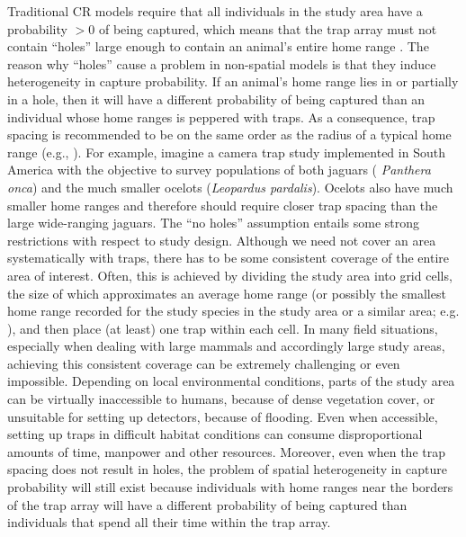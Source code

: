 Traditional CR models require that all individuals in the study area
have a probability $>0$ of being captured, which means that the trap
array must not contain ``holes'' large enough to contain an animal's
entire home range \citep{otis_etal:1978}. The reason why ``holes''
cause a problem in non-spatial models is that they induce
heterogeneity in capture probability. If an animal's home range lies
in or partially in a hole, then it will have a different probability
of being captured than an individual whose home ranges is peppered
with traps. 
As a consequence, trap spacing is recommended to 
be on the same order as the
radius of a typical home range (e.g., \citet{dillon_kelly:2007}).
For example, imagine a camera trap study implemented in South America
with the objective to survey populations of both jaguars ({\it
  Panthera onca}) and the much smaller ocelots ({\it Leopardus
  pardalis}).  Ocelots also have much smaller home ranges and
therefore should require closer trap spacing than the large
wide-ranging jaguars.  The ``no holes'' assumption entails some strong
restrictions with respect to study design. Although we need not cover
an area systematically with traps, there has to be some consistent
coverage of the entire area of interest. Often, this is achieved by
dividing the study area into grid cells, the size of which
approximates an average home range (or possibly the smallest home
range recorded for the study species in the study area or a similar
area; e.g. \citet{wallace_etal:2003}), and then place (at least) one
trap within each cell.
In many field situations, especially when dealing with large mammals
and accordingly large study areas, achieving this consistent coverage
can be extremely challenging or even impossible. Depending on local
environmental conditions, parts of the study area can be virtually
inaccessible to humans, because of dense vegetation cover, or
unsuitable for setting up detectors, because of flooding. Even when
accessible, setting up traps in difficult habitat conditions can
consume disproportional amounts of time, manpower and other resources.
Moreover, even when the trap spacing does not result in holes, the
problem of spatial heterogeneity in capture probability will still
exist because individuals with home ranges near the borders of the
trap array will have a different probability of being captured than
individuals that spend all their time within the trap array.

